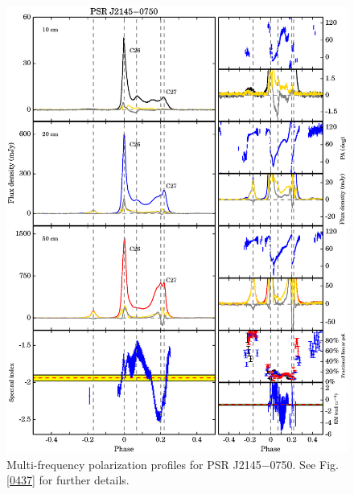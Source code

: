 \documentclass[useAMS,usenatbib]{mn2e}
\begin{document}
\begin{appendices}
\begin{figure}
\begin{center}
\includegraphics[width=6 in]{2145.ps}
\caption{Multi-frequency polarization profiles for PSR J2145$-$0750. 
See Fig. \ref{0437} for further details.}
\label{2145}
\end{center}
\end{figure}


\end{appendices}
\end{document}
